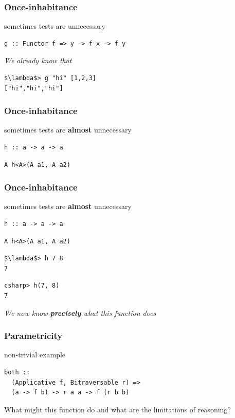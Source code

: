 \begin{frame}[fragile]
\frametitle{Once-inhabitance}
\begin{block}{sometimes tests are unnecessary}
\begin{lstlisting}[style=haskell]
g :: Functor f => y -> f x -> f y
\end{lstlisting}
\end{block}
\emph{We already know that}
\begin{lstlisting}[style=haskell,mathescape]
$\lambda$> g "hi" [1,2,3]
["hi","hi","hi"]
\end{lstlisting}
\end{frame}

\begin{frame}[fragile]
\frametitle{Once-inhabitance}
\begin{block}{sometimes tests are \textbf{almost} unnecessary}
\begin{lstlisting}[style=haskell]
h :: a -> a -> a
\end{lstlisting}
\begin{lstlisting}[style=csharp]
A h<A>(A a1, A a2)
\end{lstlisting}
\end{block}
\end{frame}

\begin{frame}[fragile]
\frametitle{Once-inhabitance}
\begin{block}{sometimes tests are \textbf{almost} unnecessary}
\begin{lstlisting}[style=haskell]
h :: a -> a -> a
\end{lstlisting}
\begin{lstlisting}[style=csharp]
A h<A>(A a1, A a2)
\end{lstlisting}

\end{block}
\begin{lstlisting}[style=haskell,mathescape]
$\lambda$> h 7 8
7
\end{lstlisting}
\begin{lstlisting}[style=csharp]
csharp> h(7, 8)
7
\end{lstlisting}
\emph{We now know \textbf{precisely} what this function does}
\end{frame}

\begin{frame}[fragile]
\frametitle{Parametricity}
\begin{block}{non-trivial example}
\begin{lstlisting}[style=haskell]
both ::
  (Applicative f, Bitraversable r) =>
  (a -> f b) -> r a a -> f (r b b)
\end{lstlisting}
\end{block}
\begin{center}
What might this function do and what are the limitations of reasoning?
\end{center}
\end{frame}

